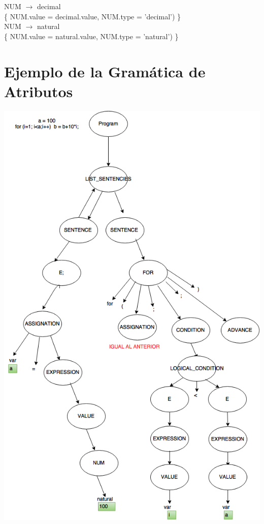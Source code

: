 \documentclass[10pt,a4paper]{article}
\begin{document}
{{{NUM $\rightarrow$ decimal \\

\{ NUM.value = decimal.value, NUM.type = 'decimal') \}  \\ 

NUM $\rightarrow$ natural \\

\{ NUM.value = natural.value, NUM.type = 'natural') \}  \\ 


\section{Ejemplo de la Gramática de Atributos}

\begin{center}
\includegraphics[scale=0.7]{imgs/ejemploGramatica.png}
\end{center}

}}}
\end{document}
